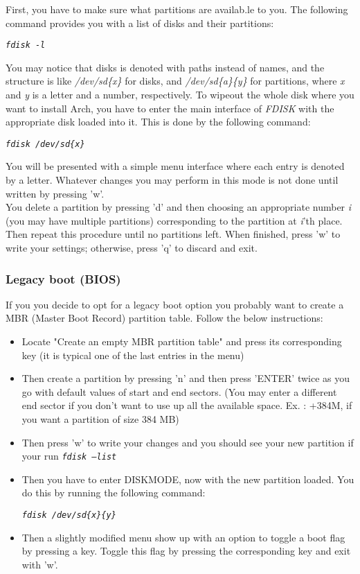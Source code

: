\documentclass{article}
\newcommand{\code}[1]{\begin{center}
		\textit{\texttt{#1}}
\end{center}}
\newcommand{\inlineCode}[1]{\textit{\texttt{#1}}}
\begin{document}
	 First, you have to make sure what partitions are availab.le to you. The following command provides you with a list of disks and their partitions:
	 
	 \code{fdisk -l}
	 
	 You may notice that disks is denoted with paths instead of names, and the structure is like \textit{/dev/sd\{x\}} for disks, and \textit{/dev/sd\{a\}\{y\}} for partitions, where \textit{x} and \textit{y} is a letter and a number, respectively. To wipeout the whole disk where you want to install Arch, you have to enter the main interface of \textit{FDISK} with the appropriate disk loaded into it. This is done by the following command:
	 
	 \code{fdisk /dev/sd\{x\}}
	 
	 You will be presented with a simple menu interface where each entry is denoted by a letter. Whatever changes you may perform in this mode is not done until written by pressing 'w'.\\
	 
	 You delete a partition by pressing 'd' and then choosing an appropriate number \textit{i} (you may have multiple partitions) corresponding to the partition at \textit{i}'th place. Then repeat this procedure until no partitions left. When finished, press 'w' to write your settings; otherwise, press 'q' to discard and exit. 
	 
	 \subsubsection{Legacy boot (BIOS)}
	 
	 If you you decide to opt for a legacy boot option you probably want to create a MBR (Master Boot Record) partition table. Follow the below instructions:
	 \begin{itemize}
	 	\item Locate "Create an empty MBR partition table" and press its corresponding key (it is typical one of the last entries in the menu)
	 	\item Then create a partition by pressing 'n' and then press 'ENTER' twice as you go with default values of start and end sectors. (You may enter a different end sector if you don't want to use up all the available space. Ex. : +384M, if you want a partition of size 384 MB)
	 	\item Then press 'w' to write your changes and you should see your new partition if your run \inlineCode{fdisk --list}
	 	\item Then you have to enter DISKMODE, now with the new partition loaded. You do this by running the following command:
	 	\code{fdisk /dev/sd\{x\}\{y\}}
	 	\item Then a slightly modified menu show up with an option to toggle a boot flag by pressing a key. Toggle this flag by pressing the corresponding key and exit with 'w'. 	
	 \end{itemize}
 	 
\end{document}

